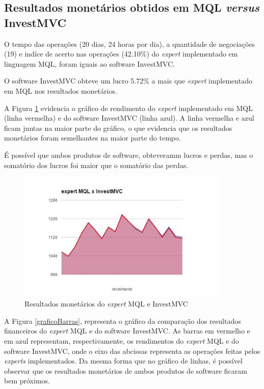\subsection{Resultados monetários obtidos em MQL \textit{versus} InvestMVC}
O tempo das operações (20 dias, 24 horas por dia), a quantidade de negociações (19) e indíce de acerto nas operações (42.10\%) do \textit{expert} implementado em linguagem MQL, foram iguais ao software InvestMVC.

O software InvestMVC obteve um lucro 5.72\% a mais que \textit{expert} implementado em MQL nos resultados monetários. 

A Figura \ref{rendimentoVersus} evidencia o gráfico de rendimento do \textit{expert} implementado em MQL (linha vermelha) e do software InvestMVC (linha azul). A linha vermelha e azul ficam juntas na maior parte do gráfico, o que evidencia que os resultados monetários foram semelhantes na maior parte do tempo.

É possível que ambos produtos de software, obteveramm lucros e perdas, mas o somatório dos lucros foi maior que o somatório das perdas.

\begin{figure}[H]
\centering
\includegraphics[width=0.9\textwidth]{figuras/rendimentoVersus}
\caption{Resultados monetários do \textit{expert} MQL e InvestMVC}
\label{rendimentoVersus}
\end{figure}

A Figura \ref{graficoBarras}, representa o gráfico da comparação dos resultados financeiros do \textit{expert} MQL e do software InvestMVC. As barras em vermelho e em azul representam, respectivamente, os rendimentos do \textit{expert} MQL e do software InvestMVC, onde o eixo das abcissas representa as operações feitas pelos  \textit{experts} implementados. Da mesma forma que no gráfico de linhas, é possível observar que os resultados monetários de ambos produtos de software ficaram bem próximos.


